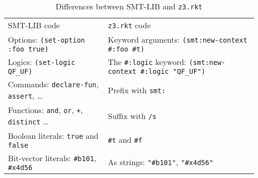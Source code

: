 \begin{table}[hbt]
\caption{Differences between SMT-LIB and \texttt{z3.rkt}}
\label{table:smt-porting}
\begin{center}
\begin{tabularx}{0.91\textwidth}{lX}
\hline\noalign{\smallskip}
SMT-LIB code & \texttt{z3.rkt} code \\
\noalign{\smallskip}
\hline
\noalign{\smallskip}
Options: \texttt{(set-option :foo true)} & Keyword arguments: \newline \texttt{(smt:new-context \#:foo \#t)} \\

Logics: \texttt{(set-logic QF\_UF)} & The \texttt{\#:logic} keyword: \newline \texttt{(smt:new-context \#:logic "QF\_UF")} \\

Commands: \texttt{declare-fun}, \texttt{assert}, \ldots & Prefix with \texttt{smt:} \\

Functions: \texttt{and}, \texttt{or}, \texttt{+}, \texttt{distinct} \ldots & Suffix with \texttt{/s} \\

Boolean literals: \texttt{true} and \texttt{false} & \texttt{\#t} and \texttt{\#f} \\

Bit-vector literals: \texttt{\#b101}, \texttt{\#x4d56} & As strings: \texttt{"\#b101"}, \texttt{"\#x4d56"} \\
\hline
\end{tabularx}
\end{center}
\end{table}
